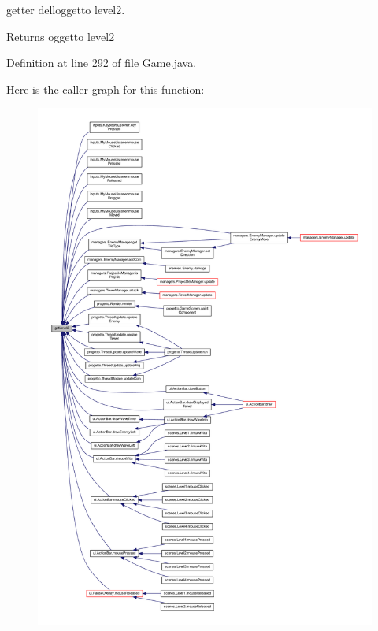 getter dell\textquotesingle{}oggetto level2. 

\begin{DoxyReturn}{Returns}
oggetto level2 
\end{DoxyReturn}


Definition at line 292 of file Game.\+java.

Here is the caller graph for this function\+:\nopagebreak
\begin{figure}[H]
\begin{center}
\leavevmode
\includegraphics[width=350pt]{classprogetto_1_1_game_a26827f97d382e852c53c15990619c8b7_icgraph}
\end{center}
\end{figure}
\mbox{\label{classprogetto_1_1_game_a0869f04fd1631b5ad909e51c85e9e57b}} 
